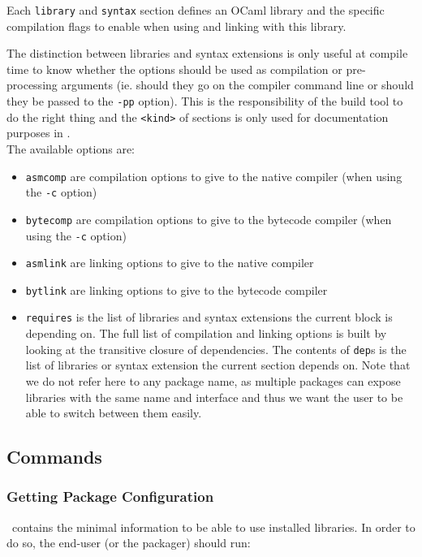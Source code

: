 \documentclass[a4paper,10pt]{article}
\begin{document}
Each {\tt library} and {\tt syntax} section defines an OCaml library
and the specific compilation flags to enable when using and linking
with this library.

The distinction between libraries and syntax extensions is only useful
at compile time to know whether the options should be used as
compilation or pre-processing arguments (ie. should they go on the
compiler command line or should they be passed to the {\tt -pp}
option). This is the responsibility of the build tool to do the right
thing and the {\tt <kind>} of sections is only used for documentation
purposes in \OPAM. \\

The available options are:

\begin{itemize}
\item {\tt asmcomp} are compilation options to give to the native
  compiler (when using the {\tt -c} option)
\item {\tt bytecomp} are compilation options to give to the bytecode
  compiler (when using the {\tt -c} option)
\item {\tt asmlink} are linking options to give to the native compiler
\item {\tt bytlink} are linking options to give to the bytecode
  compiler
\item {\tt requires} is the list of libraries and syntax extensions
  the current block is depending on. The full list of compilation
  and linking options is built by looking at the transitive closure of
  dependencies. The contents of {\tt dep}s is the list of libraries or
  syntax extension the current section depends on. Note that we do not
  refer here to any package name, as multiple packages can expose libraries
  with the same name and interface and thus we want the user to be able
  to switch between them easily.
\end{itemize}

\subsection{Commands}

\subsubsection{Getting Package Configuration}

\OPAM\ contains the minimal information to be able to use installed
libraries. In order to do so, the end-user (or the packager) should
run:
\end{document}
